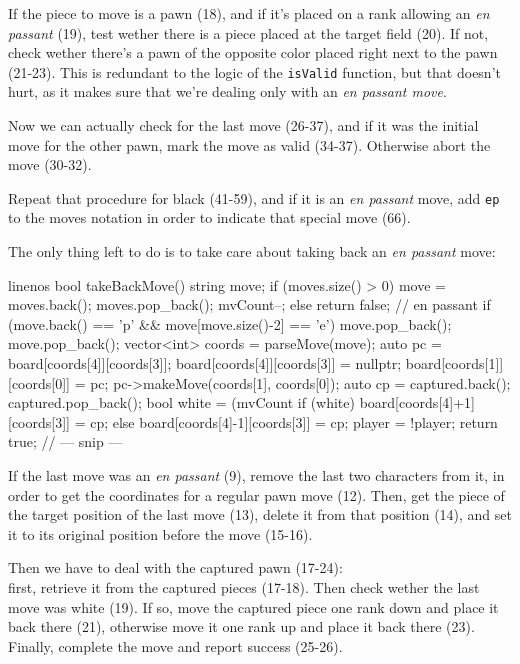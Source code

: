 If the piece to move is a pawn (18), and if it's placed on a rank allowing an \emph{en passant} (19),
test wether there is a piece placed at the target field (20).
If not, check wether there's a pawn of the opposite color placed right next to the pawn (21-23).
This is redundant to the logic of the \texttt{isValid} function, but that doesn't hurt, as it makes
sure that we're dealing only with an \emph{en passant move}.

Now we can actually check for the last move (26-37), and if it was the initial move for the other
pawn, mark the move as valid (34-37).
Otherwise abort the move (30-32).

Repeat that procedure for black (41-59), and if it is an \emph{en passant} move, add \texttt{ep}
to the moves notation in order to indicate that special move (66).

The only thing left to do is to take care about taking back an \emph{en passant} move:

\begin{cpp*}{linenos}
bool takeBackMove() {
  string move;
  if (moves.size() > 0) {
    move = moves.back();
    moves.pop_back();
    mvCount--;
  } else return false;
  // en passant
  if (move.back() == 'p' && move[move.size()-2] == 'e') {
    move.pop_back();
    move.pop_back();
    vector<int> coords = parseMove(move);
    auto pc = board[coords[4]][coords[3]];
    board[coords[4]][coords[3]] = nullptr;
    board[coords[1]][coords[0]] = pc;
    pc->makeMove(coords[1], coords[0]);
    auto cp = captured.back();
    captured.pop_back();
    bool white = (mvCount %
    if (white) {
      board[coords[4]+1][coords[3]] = cp;
    } else {
      board[coords[4]-1][coords[3]] = cp;
    }
    player = !player;
    return true;
  }
  // --- snip ---
}
\end{cpp*}

If the last move was an \emph{en passant} (9), remove the last two characters from it, in order to
get the coordinates for a regular pawn move (12).
Then, get the piece of the target position of the last move (13), delete it from that position (14),
and set it to its original position before the move (15-16).

Then we have to deal with the captured pawn (17-24):\\
first, retrieve it from the captured pieces (17-18).
Then check wether the last move was white (19).
If so, move the captured piece one rank down and place it back there (21), otherwise move it one
rank up and place it back there (23).
Finally, complete the move and report success (25-26).

